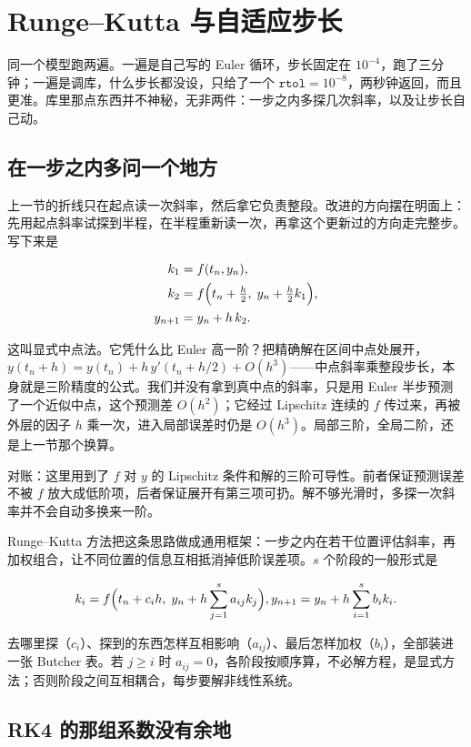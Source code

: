 \section{Runge--Kutta 与自适应步长}
\label{sec:08-Numerical-Analysis/06-ODE/02}

同一个模型跑两遍。一遍是自己写的 Euler 循环，步长固定在 \(10^{-4}\)，跑了三分钟；一遍是调库，什么步长都没设，只给了一个 \(\texttt{rtol}=10^{-8}\)，两秒钟返回，而且更准。库里那点东西并不神秘，无非两件：一步之内多探几次斜率，以及让步长自己动。

\subsection{在一步之内多问一个地方}

上一节的折线只在起点读一次斜率，然后拿它负责整段。改进的方向摆在明面上：先用起点斜率试探到半程，在半程重新读一次，再拿这个更新过的方向走完整步。写下来是

\[
\begin{aligned}
k_1&=f(t_n,y_n),\\
k_2&=f\Bigl(t_n+\tfrac h2,\;y_n+\tfrac h2 k_1\Bigr),\\
y_{n+1}&=y_n+h\,k_2 .
\end{aligned}
\]

这叫显式中点法。它凭什么比 Euler 高一阶？把精确解在区间中点处展开，\(y(t_n+h)=y(t_n)+h\,y'(t_n+h/2)+O(h^3)\)——中点斜率乘整段步长，本身就是三阶精度的公式。我们并没有拿到真中点的斜率，只是用 Euler 半步预测了一个近似中点，这个预测差 \(O(h^2)\)；它经过 Lipschitz 连续的 \(f\) 传过来，再被外层的因子 \(h\) 乘一次，进入局部误差时仍是 \(O(h^3)\)。局部三阶，全局二阶，还是上一节那个换算。

对账：这里用到了 \(f\) 对 \(y\) 的 Lipschitz 条件和解的三阶可导性。前者保证预测误差不被 \(f\) 放大成低阶项，后者保证展开有第三项可扔。解不够光滑时，多探一次斜率并不会自动多换来一阶。

Runge--Kutta 方法把这条思路做成通用框架：一步之内在若干位置评估斜率，再加权组合，让不同位置的信息互相抵消掉低阶误差项。\(s\) 个阶段的一般形式是

\[
k_i=f\Bigl(t_n+c_ih,\;y_n+h\sum_{j=1}^{s}a_{ij}k_j\Bigr),\qquad
y_{n+1}=y_n+h\sum_{i=1}^{s}b_ik_i .
\]

去哪里探（\(c_i\)）、探到的东西怎样互相影响（\(a_{ij}\)）、最后怎样加权（\(b_i\)），全部装进一张 Butcher 表。若 \(j\ge i\) 时 \(a_{ij}=0\)，各阶段按顺序算，不必解方程，是显式方法；否则阶段之间互相耦合，每步要解非线性系统。

\subsection{RK4 的那组系数没有余地}

